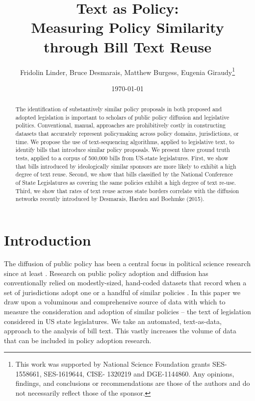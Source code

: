\documentclass[12pt]{article} %
\begin{document}
 


\title{Text as Policy: \\ Measuring Policy Similarity through Bill Text Reuse}
\date{\today}
\author{Fridolin Linder, Bruce Desmarais, Matthew Burgess, Eugenia
Giraudy\footnote{This work was supported by National Science Foundation grants
SES-1558661, SES-1619644, CISE-
1320219 and DGE-1144860. Any opinions, findings, and conclusions or
recommendations are those of the
authors and do not necessarily reflect those of the sponsor.}}

\maketitle




\singlespacing
\begin{abstract} 
    \noindent The identification of substantively similar policy proposals in both proposed and adopted legislation is important to scholars of public policy diffusion and legislative politics. Conventional, manual, approaches are prohibitively costly in constructing datasets that accurately represent policymaking across policy domains, jurisdictions, or time. We propose the use of text-sequencing algorithms, applied to legislative text, to identify bills that introduce similar policy proposals. We present three ground truth tests, applied to a corpus of 500,000 bills from US-state legislatures. First, we show that bills introduced by ideologically similar sponsors are more likely to exhibit a high degree of text reuse. Second, we show that bills classified by the National Conference of State Legislatures as covering the same policies exhibit a high degree of text re-use. Third, we show that rates of text reuse across state borders correlate with the diffusion networks recently introduced by Desmarais, Harden and Boehmke (2015).

\end{abstract}

\doublespacing
\clearpage


\section{Introduction} 

The diffusion of public policy has been a central focus in political science research since at least \citet{walker1969}. Research on public policy adoption and diffusion has conventionally relied on modestly-sized, hand-coded datasets that record when a set of jurisdictions adopt one or a handful of similar policies \citep{boehmke2012}. In this paper we draw upon a voluminous and comprehensive source of data with which to measure the consideration and adoption of similar policies -- the text of legislation considered in US state legislatures. We take an automated, text-as-data, approach to the analysis of bill text. This vastly increases the volume of data that can be included in policy adoption research. 
\end{document}
